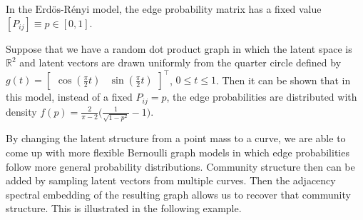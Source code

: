 \documentclass[12pt]{article}
\begin{document}
\begin{example}
In the $\text{Erd\"{o}s-R\'{e}nyi}$ model, the edge probability matrix has a fixed value $[P_{ij}] \equiv p \in [0, 1]$. 

Suppose that we have a random dot product graph in which the latent space is $\mathbb{R}^2$ and latent vectors are drawn uniformly from the quarter circle defined by $g(t) = \begin{bmatrix} \cos(\frac{\pi}{2} t) & \sin(\frac{\pi}{2} t) \end{bmatrix}^\top$, $0 \leq t \leq 1$. 
Then it can be shown that in this model, instead of a fixed $P_{ij} = p$, the edge probabilities are distributed with density $f(p) = \frac{2}{\pi - 2} \Big(\frac{1}{\sqrt{1 - p^2}} - 1 \Big)$. 
\end{example}

By changing the latent structure from a point mass to a curve, we are
able to come up with more flexible Bernoulli graph models in which edge
probabilities follow more general probability distributions. Community
structure then can be added by sampling latent vectors from multiple
curves. Then the adjacency spectral embedding of the resulting graph
allows us to recover that community structure. This is illustrated in
the following example.
\end{document}
